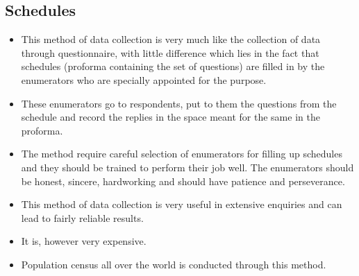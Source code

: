 \documentclass[
10pt, %
a4paper, %
]{report}
\begin{document}
\subsection*{Schedules}
\begin{itemize}
\item This method of data collection is very much like the collection of data through questionnaire, with little difference which lies in the fact that schedules (proforma containing the set of questions) are filled in by the enumerators who are specially appointed for the purpose.
\item These enumerators go to respondents, put to them the questions from the schedule and record the replies in the space meant for the same in the proforma.
\item The method require careful selection of enumerators for filling up schedules and they should be trained to perform their job well. The enumerators should be honest, sincere, hardworking and should have patience and perseverance.
\item This method of data collection is very useful in extensive enquiries and can lead to fairly reliable results.
\item It is, however very expensive.
\item Population census all over the world is conducted through this method.
\end{itemize}
\end{document}
